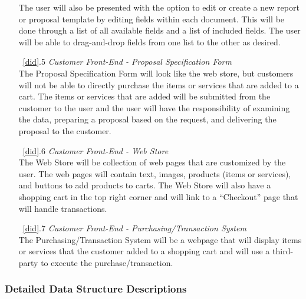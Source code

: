 \documentclass{article}
\newcommand{\br}{\vspace{2mm}}
\begin{document}
\begin{enumerate}
        The user will also be presented with the option to edit or create a
        new report or proposal template by editing fields within each document.  This
        will be done through a list of all available fields and a list of included
        fields.  The user will be able to drag-and-drop fields from one list to
        the other as desired.
    \item[~\ref{did}.5 ] \emph{Customer Front-End - Proposal Specification Form}\br\\
        The Proposal Specification Form will look like the web store, but
        customers will not be able to directly purchase the items or services
        that are added to a cart.  The items or services that are added will
        be submitted from the customer to the user and the user will have the
        responsibility of examining the data, preparing a proposal based on the
        request, and delivering the proposal to the customer.
    \item[~\ref{did}.6 ] \emph{Customer Front-End - Web Store}\br\\
        The Web Store will be collection of web pages that are customized by
        the user.  The web pages will contain text, images, products (items or
        services), and buttons to add products to carts.  The Web Store will also
        have a shopping cart in the top right corner and will link to a ``Checkout''
        page that will handle transactions.
    \item[~\ref{did}.7 ] \emph{Customer Front-End - Purchasing/Transaction System}\br\\
        The Purchasing/Transaction System will be a webpage that will display
        items or services that the customer added to a shopping cart and will use
        a third-party to execute the purchase/transaction.
\end{enumerate}



\subsubsection{Detailed Data Structure Descriptions}
\label{ddsd}
\end{document}
